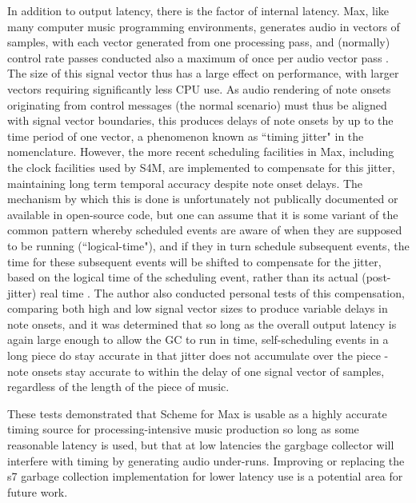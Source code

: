 \documentclass[acmsmall]{acmart}
\begin{document}
In addition to output latency, there is the factor of internal latency.
Max, like many computer music programming environments, generates audio 
in vectors of samples, with
each vector generated from one processing pass, and (normally) control
rate passes conducted also a maximum of once per audio vector pass \cite{Puckette2002}.
The size of this signal vector thus has a large effect on performance, with larger
vectors requiring significantly less CPU use. As audio rendering of note onsets originating
from control messages (the normal scenario) must thus be aligned with 
signal vector boundaries, this produces delays of note onsets by up to
the time period of one vector, a phenomenon known as ``timing jitter" in the nomenclature.
However, the more recent scheduling facilities in Max, including the 
clock facilities used by S4M, are implemented to compensate for this jitter,
maintaining long term temporal accuracy despite note onset delays. The mechanism
by which this is done is unfortunately not publically documented or available
in open-source code, but one can assume that it is some variant of the common pattern 
whereby scheduled events are aware of when they are supposed to be running
(``logical-time"), and if they in turn schedule subsequent events, the time for these subsequent
events will be shifted to compensate for the jitter, based 
on the logical time of the scheduling event, rather than its
actual (post-jitter) real time \cite{Anderson1986}.
The author also conducted personal tests of 
this compensation, comparing both high and low signal vector sizes to produce
variable delays in note onsets, and it was determined
that so long as the overall output latency is again large enough to allow
the GC to run in time, self-scheduling events in a long piece do stay
accurate in that jitter does not accumulate over the piece - 
note onsets stay accurate to within the delay of one signal vector of samples,
regardless of the length of the piece of music.

These tests demonstrated that Scheme for Max is usable as a highly accurate
timing source for processing-intensive music production so long as some
reasonable latency is used, but that at low latencies the gargbage
collector will interfere with timing by generating audio under-runs.
Improving or replacing the s7 garbage collection implementation for 
lower latency use is a potential area for future work. 
\end{document}
